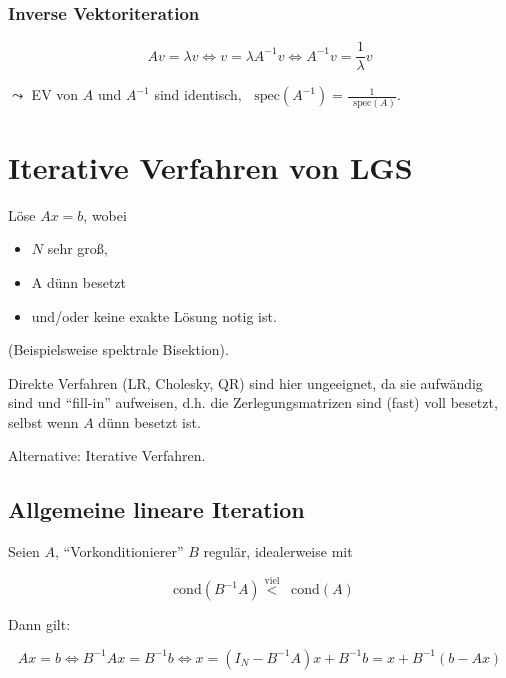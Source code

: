 \documentclass[a4paper, 14pt]{article}
\newcommand*\Spektrum{\mathop{}\!\mathrm{spec}}
\newcommand*\cond{\mathop{}\!\mathrm{cond}}
\begin{document}
	\subsubsection{Inverse Vektoriteration}

	\begin{equation}
		A v = \lambda v \Leftrightarrow v = \lambda A^{-1} v \Leftrightarrow A^{-1} v = \frac{1}{\lambda} v
	\end{equation}

	$\leadsto$ EV von $A$ und $A^{-1}$ sind identisch, $\Spektrum(A^{-1}) = \frac{1}{\Spektrum(A)}$.

	\section{Iterative Verfahren von LGS}

	Löse $Ax = b$, wobei

	\begin{itemize}
		\item $N$ sehr groß,
		\item A dünn besetzt
		\item und/oder keine exakte Lösung notig ist.
	\end{itemize}

	(Beispielsweise spektrale Bisektion).

	Direkte Verfahren (LR, Cholesky, QR) sind hier ungeeignet, da sie aufwändig sind und \enquote{fill-in} aufweisen, d.h. die Zerlegungsmatrizen sind (fast) voll besetzt, selbst wenn $A$ dünn besetzt ist.

	Alternative: Iterative Verfahren.

	\subsection{Allgemeine lineare Iteration}

	Seien $A$, \enquote{Vorkonditionierer} $B$ regulär, idealerweise mit

	\begin{equation}
		\cond(B^{-1} A) \stackrel{\textrm{viel}}{<} \cond(A)
	\end{equation}

	Dann gilt:

	\begin{equation}
		A x = b \Leftrightarrow B^{-1} A x = B^{-1} b \Leftrightarrow x = (I_N - B^{-1} A)x + B^{-1} b = x + B^{-1} (b - A x)
	\end{equation}
\end{document}
